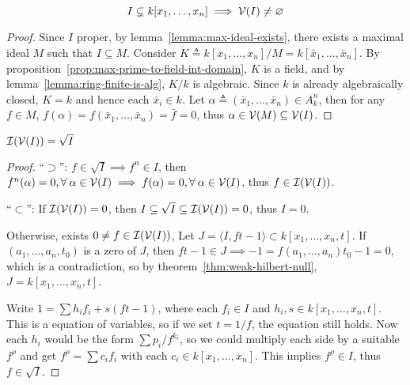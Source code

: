 \begin{theorem} \label{thm:weak-hilbert-null}
  \[ I \subsetneq k[x_1, \dots, x_n] \implies \mathcal{V}(I) \neq \varnothing \]

  \begin{proof}
    Since $I$ proper, by lemma~\ref{lemma:max-ideal-exists},
    there exists a maximal ideal $M$ such that $I \subseteq M$.
    Consider $K \triangleq k[x_1, \dots, x_n] / M = k[\bar{x}_1, \dots, \bar{x}_n]$.
    By proposition~\ref{prop:max-prime-to-field-int-domain}, $K$ is a field,
    and by lemma~\ref{lemma:ring-finite-is-alg}, $K/k$ is algebraic. Since $k$
    is already algebraically closed, $K = k$ and hence each $\bar{x}_i \in k$.
    Let $\alpha \triangleq (\bar{x}_1, \dots, \bar{x}_n) \in A_k^n$, then
    for any $f \in M$, $f(\alpha) = f(\bar{x}_1, \dots, \bar{x}_n) = \bar{f} = 0$,
    thus $\alpha \in \mathcal{V}(M) \subseteq \mathcal{V}(I)$.
  \end{proof}
\end{theorem}

\begin{theorem} \label{thm:strong-hilbert-null}
  $\mathcal{I}(\mathcal{V}(I)) = \sqrt{I}$

  \begin{proof}
    ``$\supset$'': $f \in \sqrt{I} \implies f^n \in I$, then
    $f^n(\alpha) = 0, \forall \alpha \in \Vc(I)
    \implies f(\alpha) = 0, \forall \alpha \in \Vc(I)$, thus $f \in \mathcal{I}(\mathcal{V}(I))$.

    ``$\subset$'': If $\mathcal{I}(\mathcal{V}(I)) = 0$, then $I \subseteq \sqrt{I} \subseteq \mathcal{I}(\mathcal{V}(I)) = 0$,
    thus $I = 0$.

    Otherwise, exists $0 \neq f \in \mathcal{I}(\mathcal{V}(I))$, Let $J = \langle I, ft-1 \rangle \subset k[x_1, \dots, x_n, t]$.
    If $(a_1, \dots, a_n, t_0)$ is a zero of $J$, then $ft-1 \in J \implies -1 = f(a_1, \dots, a_n) t_0 - 1 =
    0$, which is a contradiction, so by theorem~\ref{thm:weak-hilbert-null}, $J = k[x_1, \dots, x_n, t]$.

    Write $1 = \sum h_i f_i + s (ft-1)$, where each $f_i \in I$ and
    $h_i, s \in k[x_1, \dots, x_n, t]$.
    This is a equation of variables, so if we set $t = 1/f$, the equation still holds.
    Now each $h_i$ would be the form $\sum p_i / f^{k_i}$, so we could multiply each
    side by a suitable $f^\rho$ and get $f^\rho = \sum c_i f_i$ with each $c_i \in k[x_1, \dots, x_n]$.
    This implies $f^\rho \in I$, thus $f \in \sqrt{I}$.
  \end{proof}
\end{theorem}

